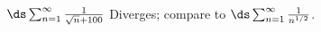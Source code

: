 {$\ds \sum_{n=1}^\infty \frac{1}{\sqrt{n}+100}$
}
{Diverges; compare to $\ds \sum_{n=1}^\infty \frac {1}{n^{1/2}}$. 
}